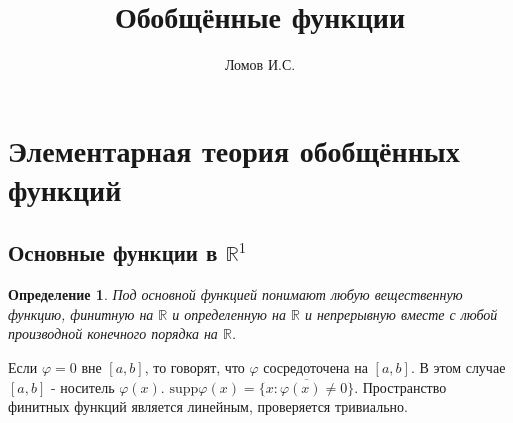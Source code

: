 \documentclass[9pt, a4paper]{article}
\title{Обобщённые функции}
\author{Ломов И.С.}
\date{}
\newtheorem*{definition}{Определение}
\begin{document}
\maketitle
\section{Элементарная теория обобщённых функций}
	\subsection{Основные функции в $\mathbb{R}^1$}
		\begin{definition}
			Под основной функцией понимают любую вещественную функцию,  финитную на $\mathbb{R}$ и определенную на $\mathbb{R}$ и непрерывную вместе с любой производной конечного порядка на $\mathbb{R}$.
		\end{definition}
		Если $\varphi = 0$ вне $[a,b]$, то говорят, что $\varphi$ сосредоточена на $[a,b]$. В этом случае $[a,b]$ - носитель $\varphi(x)$. $\mathrm{supp} \varphi(x) = \overline{\{x: \varphi(x) \neq 0\}}$.
		Пространство финитных функций является линейным, проверяется тривиально.
\end{document}
